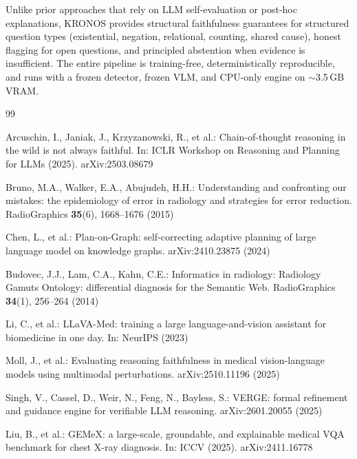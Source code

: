 \documentclass[runningheads]{llncs}
\begin{document}
Unlike prior approaches that rely on LLM self-evaluation or post-hoc
explanations, KRONOS provides structural faithfulness guarantees for
structured question types (existential, negation, relational, counting,
shared cause), honest flagging for open questions, and principled
abstention when evidence is insufficient.
The entire pipeline is training-free, deterministically reproducible, and
runs with a frozen detector, frozen VLM, and CPU-only engine on
$\sim$3.5\,GB VRAM.


\begin{thebibliography}{99}

Arcuschin, I., Janiak, J., Krzyzanowski, R., et al.:
Chain-of-thought reasoning in the wild is not always faithful.
In: ICLR Workshop on Reasoning and Planning for LLMs (2025).
arXiv:2503.08679

Bruno, M.A., Walker, E.A., Abujudeh, H.H.:
Understanding and confronting our mistakes: the epidemiology of error in
radiology and strategies for error reduction.
RadioGraphics \textbf{35}(6), 1668--1676 (2015)

Chen, L., et al.:
Plan-on-Graph: self-correcting adaptive planning of large language model
on knowledge graphs.
arXiv:2410.23875 (2024)

Budovec, J.J., Lam, C.A., Kahn, C.E.:
Informatics in radiology: Radiology Gamuts Ontology: differential
diagnosis for the Semantic Web.
RadioGraphics \textbf{34}(1), 256--264 (2014)

Li, C., et al.:
LLaVA-Med: training a large language-and-vision assistant for biomedicine
in one day.
In: NeurIPS (2023)

Moll, J., et al.:
Evaluating reasoning faithfulness in medical vision-language models using
multimodal perturbations.
arXiv:2510.11196 (2025)

Singh, V., Cassel, D., Weir, N., Feng, N., Bayless, S.:
VERGE: formal refinement and guidance engine for verifiable LLM reasoning.
arXiv:2601.20055 (2025)

Liu, B., et al.:
GEMeX: a large-scale, groundable, and explainable medical VQA benchmark
for chest X-ray diagnosis.
In: ICCV (2025). arXiv:2411.16778


\end{thebibliography}
\end{document}
